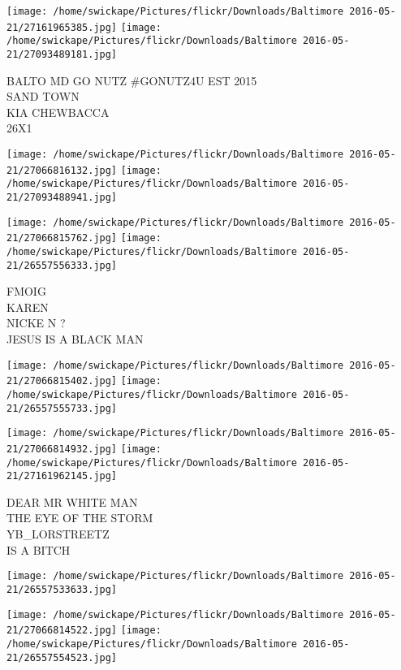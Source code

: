 \documentclass[10pt,letterpaper]{article}
\begin{document}
\texttt{[image: /home/swickape/Pictures/flickr/Downloads/Baltimore 2016-05-21/27161965385.jpg]}
\texttt{[image: /home/swickape/Pictures/flickr/Downloads/Baltimore 2016-05-21/27093489181.jpg]}

BALTO MD GO NUTZ \#GONUTZ4U EST 2015\\
SAND TOWN\\
KIA CHEWBACCA\\
26X1\\
\pagebreak

\texttt{[image: /home/swickape/Pictures/flickr/Downloads/Baltimore 2016-05-21/27066816132.jpg]}
\texttt{[image: /home/swickape/Pictures/flickr/Downloads/Baltimore 2016-05-21/27093488941.jpg]}

\texttt{[image: /home/swickape/Pictures/flickr/Downloads/Baltimore 2016-05-21/27066815762.jpg]}
\texttt{[image: /home/swickape/Pictures/flickr/Downloads/Baltimore 2016-05-21/26557556333.jpg]}

FMOIG\\
KAREN\\
NICKE N ?\\
JESUS IS A BLACK MAN\\
\pagebreak

\texttt{[image: /home/swickape/Pictures/flickr/Downloads/Baltimore 2016-05-21/27066815402.jpg]}
\texttt{[image: /home/swickape/Pictures/flickr/Downloads/Baltimore 2016-05-21/26557555733.jpg]}

\texttt{[image: /home/swickape/Pictures/flickr/Downloads/Baltimore 2016-05-21/27066814932.jpg]}
\texttt{[image: /home/swickape/Pictures/flickr/Downloads/Baltimore 2016-05-21/27161962145.jpg]}

DEAR MR WHITE MAN\\
THE EYE OF THE STORM\\
YB\_LORSTREETZ\\
IS A BITCH\\
\pagebreak

\texttt{[image: /home/swickape/Pictures/flickr/Downloads/Baltimore 2016-05-21/26557533633.jpg]}

\vspace{0.25in}
\texttt{[image: /home/swickape/Pictures/flickr/Downloads/Baltimore 2016-05-21/27066814522.jpg]}
\texttt{[image: /home/swickape/Pictures/flickr/Downloads/Baltimore 2016-05-21/26557554523.jpg]}
\end{document}
